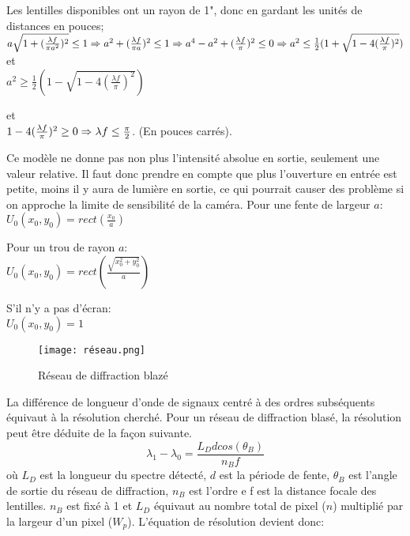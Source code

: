 \documentclass[11pt,letterpaper]{article}
\begin{document}
Les lentilles disponibles ont un rayon de 1", donc en gardant les unités de distances en pouces;
$
a\sqrt{1+(\frac{\lambda f}{\pi a^2})^2} \leq 1\\
\Rightarrow a^2+(\frac{\lambda f}{\pi a})^2 \leq 1 \\
\Rightarrow a^4-a^2+(\frac{\lambda f}{\pi})^2 \leq 0 \\
\Rightarrow
a^2 \leq \frac{1}{2}(1+\sqrt{1-4(\frac{\lambda f}{\pi})^2})\\
$
et \\
$a^2 \geq \frac{1}{2}(1-\sqrt{1-4(\frac{\lambda f}{\pi})^2})$

et \\
$1-4(\frac{\lambda f}{\pi})^2 \geq 0 \\
\Rightarrow \lambda f \leq \frac{\pi}{2}$. (En pouces carrés).


Ce modèle ne donne pas non plus l'intensité absolue en sortie, seulement une valeur relative. Il faut donc prendre en compte que plus l'ouverture en entrée est petite, moins il y aura de lumière en sortie, ce qui pourrait causer des problème si on approche la limite de sensibilité de la caméra.
Pour une fente de largeur $a$:\\ 
    $U_0(x_0,y_0)=rect(\frac{x_0}{a})$

Pour un trou de rayon $a$:\\ 
    $U_0(x_0,y_0)=rect(\frac{\sqrt{x_0^2+y_0^2}}{a})$

S'il n'y a pas d'écran: \\
    $U_0(x_0,y_0)=1$

\begin{figure}[H]
    \centering
    \texttt{[image: réseau.png]}
    \caption{Réseau de diffraction blazé}
    \label{réseau}
\end{figure}

La différence de longueur d'onde de signaux centré à des ordres subséquents équivaut à la résolution cherché. Pour un réseau de diffraction blasé, la résolution peut être déduite de la façon suivante.
\begin{equation}
    \lambda_1-\lambda_0=\frac{L_D d cos(\theta_B)}{n_B f}
\end{equation}
où $L_D$ est la longueur du spectre détecté, $d$ est la période de fente, $\theta_B$ est l'angle de sortie du réseau de diffraction, $n_B$ est l'ordre e f est la distance focale des lentilles. $n_B$ est fixé à 1 et $L_D$ équivaut au nombre total de pixel ($n$) multiplié par la largeur d'un pixel ($W_p$). L'équation de résolution devient donc:
\end{document}
